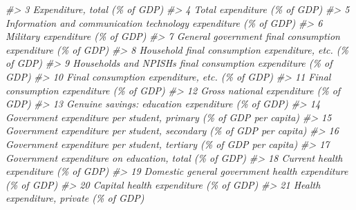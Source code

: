 \documentclass[
  xelatex, ja=standard]{bxjsbook}
\newenvironment{Shaded}{\begin{snugshade}}{\end{snugshade}}
\newcommand{\CommentTok}[1]{\textcolor[rgb]{0.56,0.35,0.01}{\textit{#1}}}
\theoremstyle{definition}
\theoremstyle{definition}
\theoremstyle{definition}
\theoremstyle{definition}
\theoremstyle{remark}
\begin{document}
\begin{Shaded}
\begin{Highlighting}[]
\CommentTok{\#\textgreater{} 3                                                                             Expenditure, total (\% of GDP)}
\CommentTok{\#\textgreater{} 4                                                                              Total expenditure (\% of GDP)}
\CommentTok{\#\textgreater{} 5                                           Information and communication technology expenditure (\% of GDP)}
\CommentTok{\#\textgreater{} 6                                                                           Military expenditure (\% of GDP)}
\CommentTok{\#\textgreater{} 7                                               General government final consumption expenditure (\% of GDP)}
\CommentTok{\#\textgreater{} 8                                                  Household final consumption expenditure, etc. (\% of GDP)}
\CommentTok{\#\textgreater{} 9                                            Households and NPISHs final consumption expenditure (\% of GDP)}
\CommentTok{\#\textgreater{} 10                                                           Final consumption expenditure, etc. (\% of GDP)}
\CommentTok{\#\textgreater{} 11                                                                 Final consumption expenditure (\% of GDP)}
\CommentTok{\#\textgreater{} 12                                                                    Gross national expenditure (\% of GDP)}
\CommentTok{\#\textgreater{} 13                                                        Genuine savings: education expenditure (\% of GDP)}
\CommentTok{\#\textgreater{} 14                                        Government expenditure per student, primary (\% of GDP per capita)}
\CommentTok{\#\textgreater{} 15                                      Government expenditure per student, secondary (\% of GDP per capita)}
\CommentTok{\#\textgreater{} 16                                       Government expenditure per student, tertiary (\% of GDP per capita)}
\CommentTok{\#\textgreater{} 17                                                    Government expenditure on education, total (\% of GDP)}
\CommentTok{\#\textgreater{} 18                                                                    Current health expenditure (\% of GDP)}
\CommentTok{\#\textgreater{} 19                                                Domestic general government health expenditure (\% of GDP)}
\CommentTok{\#\textgreater{} 20                                                                    Capital health expenditure (\% of GDP)}
\CommentTok{\#\textgreater{} 21                                                                   Health expenditure, private (\% of GDP)}

\end{Highlighting}
\end{Shaded}
\end{document}
